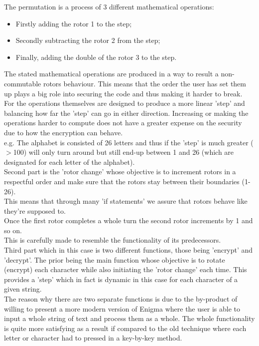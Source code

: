 \documentclass[conference,compsoc]{IEEEtran}
\begin{document}
The permutation is a process of 3 different mathematical operations:\\
\begin{itemize}
    \item Firstly adding the rotor 1 to the step;\\
    \item Secondly subtracting the rotor 2 from the step;\\
    \item Finally, adding the double of the rotor 3 to the step.\\
\end{itemize}
The stated mathematical operations are produced in a way to result a non-commutable rotors behaviour. This means that the order the user has set them up plays a big role into securing the code and thus making it harder to break.\\ 
For the operations themselves are designed to produce a more linear 'step' and balancing how far the 'step' can go in either direction. Increasing or making the operations harder to compute does not have a greater expense on the security due to how the encryption can behave.\\
e.g. The alphabet is consisted of 26 letters and thus if the 'step' is much greater ($>$100) will only turn around but still end-up between 1 and 26 (which are designated for each letter of the alphabet).\\

Second part is the 'rotor change' whose objective is to increment rotors in a respectful order and make sure that the rotors stay between their boundaries (1-26).\\
This means that through many 'if statements' we assure that rotors behave like they're supposed to.\\
Once the first rotor completes a whole turn the second rotor increments by 1 and so on.\\
This is carefully made to resemble the functionality of its predecessors.\\

Third part which in this case is two different functions, those being 'encrypt' and 'decrypt'. The prior being the main function whose objective is to rotate (encrypt) each character while also initiating the 'rotor change' each time. This provides a 'step' which in fact is dynamic in this case for each character of a given string.\\
The reason why there are two separate functions is due to the by-product of willing to present a more modern version of Enigma where the user is able to input a whole string of text and process them as a whole. The whole functionality is quite more satisfying as a result if compared to the old technique where each letter or character had to pressed in a key-by-key method.\\
\end{document}
